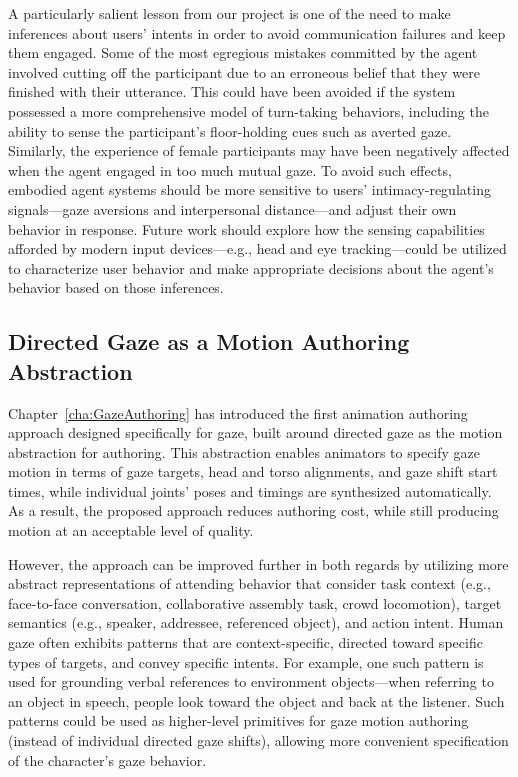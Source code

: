 A particularly salient lesson from our project is one of the need to make inferences about users' intents in order to avoid communication failures and keep them engaged. Some of the most egregious mistakes committed by the agent involved cutting off the participant due to an erroneous belief that they were finished with their utterance. This could have been avoided if the system possessed a more comprehensive model of turn-taking behaviors, including the ability to sense the participant's floor-holding cues such as averted gaze. Similarly, the experience of female participants may have been negatively affected when the agent engaged in too much mutual gaze. To avoid such effects, embodied agent systems should be more sensitive to users' intimacy-regulating signals---gaze aversions and interpersonal distance---and adjust their own behavior in response. Future work should explore how the sensing capabilities afforded by modern input devices---e.g., head and eye tracking---could be utilized to characterize user behavior and make appropriate decisions about the agent's behavior based on those inferences.

\subsection{Directed Gaze as a Motion Authoring Abstraction}

Chapter~\ref{cha:GazeAuthoring} has introduced the first animation authoring approach designed specifically for gaze, built around directed gaze as the motion abstraction for authoring.
This abstraction enables animators to specify gaze motion in terms of gaze targets, head and torso alignments, and gaze shift start times, while individual joints' poses and timings are synthesized automatically. As a result, the proposed approach reduces authoring cost, while still producing motion at an acceptable level of quality.

However, the approach can be improved further in both regards by utilizing more abstract representations of attending behavior that consider task context (e.g., face-to-face conversation, collaborative assembly task, crowd locomotion), target semantics (e.g., speaker, addressee, referenced object), and action intent. Human gaze often exhibits patterns that are context-specific, directed toward specific types of targets, and convey specific intents. For example, one such pattern is used for grounding verbal references to environment objects---when referring to an object in speech, people look toward the object and back at the listener. Such patterns could be used as higher-level primitives for gaze motion authoring (instead of individual directed gaze shifts), allowing more convenient specification of the character's gaze behavior.

